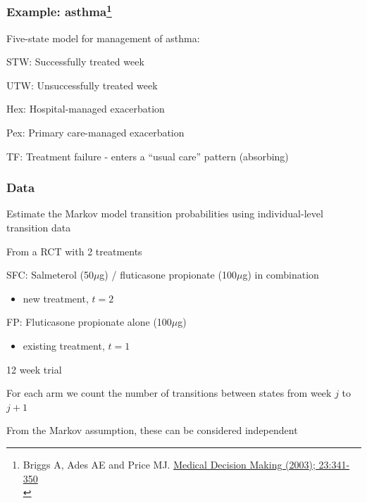 \begin{frame}
\frametitle{Example: asthma\footnote{Briggs A, Ades AE and Price MJ. \href{http://citeseerx.ist.psu.edu/viewdoc/download?doi=10.1.1.938.9909&rep=rep1&type=pdf}{Medical Decision Making (2003); 23:341-350}\\}}
Five-state model for management of asthma:
\bi
\item STW: Successfully treated week
\item UTW: Unsuccessfully treated week
\item Hex: Hospital-managed exacerbation
\item Pex: Primary care-managed exacerbation
\item TF: Treatment failure - enters a ``usual care'' pattern (absorbing)
\ei

\begin{center}
\end{center}

\end{frame}



\begin{frame}

\frametitle{Data}

Estimate the Markov model transition probabilities using individual-level transition data

\bi
\item From a RCT with 2 treatments

\bi
\item SFC: Salmeterol (50$\mu$g) / fluticasone propionate (100$\mu$g) in combination
  \begin{itemize}
  \item new treatment, $t=2$
  \end{itemize}
\item FP: Fluticasone propionate alone (100$\mu$g) 
  \begin{itemize}
  \item existing treatment, $t=1$
  \end{itemize}
  \ei

\item 12 week trial

\item For each arm we count the number of transitions between states from week $j$ to $j+1$

\item From the Markov assumption, these can be considered independent
\ei

\end{frame}

